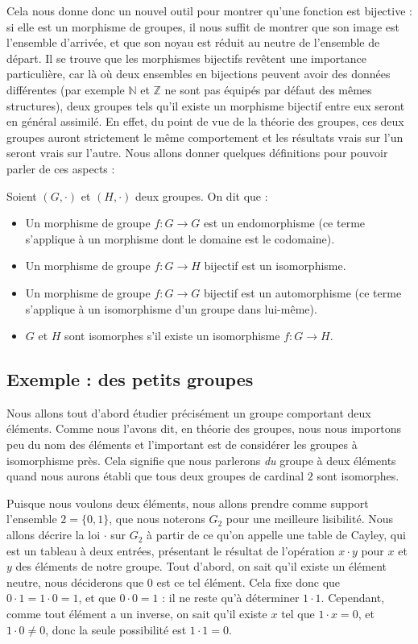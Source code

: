 Cela nous donne donc un nouvel outil pour montrer qu'une fonction est bijective : si elle est un morphisme de groupes, il nous suffit de montrer que son image est l'ensemble d'arrivée, et que son noyau est réduit au neutre de l'ensemble de départ. Il se trouve que les morphismes bijectifs revêtent une importance particulière, car là où deux ensembles en bijections peuvent avoir des données différentes (par exemple $\mathbb N$ et $\mathbb Z$ ne sont pas équipés par défaut des mêmes structures), deux groupes tels qu'il existe un morphisme bijectif entre eux seront en général assimilé. En effet, du point de vue de la théorie des groupes, ces deux groupes auront strictement le même comportement et les résultats vrais sur l'un seront vrais sur l'autre. Nous allons donner quelques définitions pour pouvoir parler de ces aspects :

\begin{defi}
    Soient $(G,\cdot)$ et $(H,\cdot)$ deux groupes. On dit que :
    \begin{itemize}[label=$\bullet$]
        \item Un morphisme de groupe $f : G \to G$ est un endomorphisme (ce terme s'applique à un morphisme dont le domaine est le codomaine).
        \item Un morphisme de groupe $f : G \to H$ bijectif est un isomorphisme.
        \item Un morphisme de groupe $f : G \to G$ bijectif est un automorphisme (ce terme s'applique à un isomorphisme d'un groupe dans lui-même).
        \item $G$ et $H$ sont isomorphes s'il existe un isomorphisme $f : G \to H$.
    \end{itemize}
\end{defi}

\subsection{Exemple : des petits groupes}

Nous allons tout d'abord étudier précisément un groupe comportant deux éléments. Comme nous l'avons dit, en théorie des groupes, nous nous importons peu du nom des éléments et l'important est de considérer les groupes à isomorphisme près. Cela signifie que nous parlerons \textit{du} groupe à deux éléments quand nous aurons établi que tous deux groupes de cardinal $2$ sont isomorphes.

Puisque nous voulons deux éléments, nous allons prendre comme support l'ensemble $2 = \{0,1\}$, que nous noterons $G_2$ pour une meilleure lisibilité. Nous allons décrire la loi $\cdot$ sur $G_2$ à partir de ce qu'on appelle une table de Cayley, qui est un tableau à deux entrées, présentant le résultat de l'opération $x\cdot y$ pour $x$ et $y$ des éléments de notre groupe. Tout d'abord, on sait qu'il existe un élément neutre, nous déciderons que $0$ est ce tel élément. Cela fixe donc que $0\cdot 1 = 1 \cdot 0 = 1$, et que $0\cdot 0 = 1$ : il ne reste qu'à déterminer $1\cdot 1$. Cependant, comme tout élément a un inverse, on sait qu'il existe $x$ tel que $1\cdot x = 0$, et $1\cdot 0 \neq 0$, donc la seule possibilité est $1\cdot 1 = 0$.


